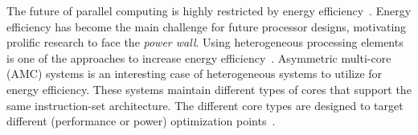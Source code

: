

The future of parallel computing is highly restricted by energy efficiency~\cite{Kogge_Exascale_TR08}. 
Energy efficiency has become the main challenge for future processor designs, motivating prolific research to face the \emph{power wall}. 
Using heterogeneous processing elements is one of the approaches to increase energy efficiency~\cite{CompCores,hetServers}. 
Asymmetric multi-core (AMC) systems is an interesting case of heterogeneous systems to utilize for energy efficiency.
These systems maintain different types of cores that support the same instruction-set architecture. 
The different core types are designed to target different (performance or power) optimization points~\cite{Kumar:ISCA2004,Balakrishnan:ISCA2005,Pangaea}. 


